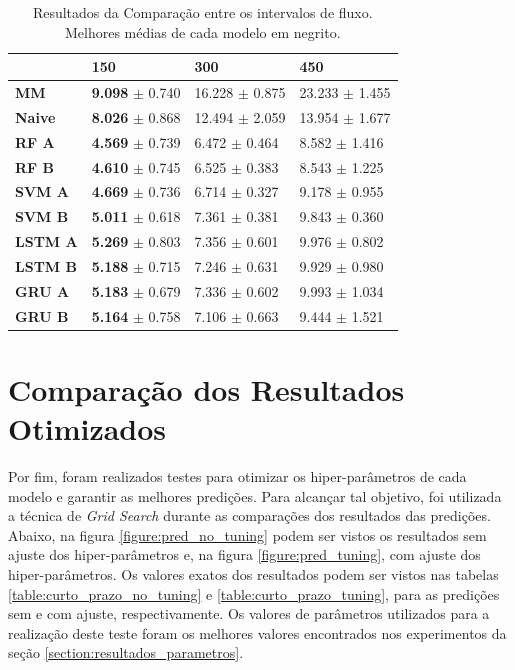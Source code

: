 \begin{table}[H]
    \begin{tabular*}{\linewidth}{@{\extracolsep{\fill}}llll}
    \toprule
     & 
    \multicolumn{1}{l}{\textbf{150}} & 
    \multicolumn{1}{l}{\textbf{300}} &
    \multicolumn{1}{l}{\textbf{450}} \\
    \midrule
    \textbf{MM} & \textbf{9.098} $\pm$ 0.740 & 16.228 $\pm$ 0.875 & 23.233 $\pm$ 1.455
    \\
    \midrule
    \textbf{Naive} & \textbf{8.026} $\pm$ 0.868 & 12.494 $\pm$ 2.059 & 13.954 $\pm$ 1.677
    \\
    \midrule
    \textbf{RF A} & \textbf{4.569} $\pm$ 0.739 & 6.472 $\pm$ 0.464 & 8.582 $\pm$ 1.416
    \\
    \midrule
    \textbf{RF B} & \textbf{4.610} $\pm$ 0.745 & 6.525 $\pm$ 0.383 & 8.543 $\pm$ 1.225
    \\
    \midrule
    \textbf{SVM A} & \textbf{4.669} $\pm$ 0.736 & 6.714 $\pm$ 0.327 & 9.178 $\pm$ 0.955
    \\
    \midrule
    \textbf{SVM B} & \textbf{5.011} $\pm$ 0.618 & 7.361 $\pm$ 0.381 & 9.843 $\pm$ 0.360
    \\
    \midrule
    \textbf{LSTM A} & \textbf{5.269} $\pm$ 0.803 & 7.356 $\pm$ 0.601 & 9.976 $\pm$ 0.802
    \\
    \midrule
    \textbf{LSTM B} & \textbf{5.188} $\pm$ 0.715 & 7.246 $\pm$ 0.631 & 9.929 $\pm$ 0.980
    \\
    \midrule
    \textbf{GRU A} & \textbf{5.183} $\pm$ 0.679 & 7.336 $\pm$ 0.602 & 9.993 $\pm$ 1.034
    \\
    \midrule
    \textbf{GRU B} & \textbf{5.164} $\pm$ 0.758 & 7.106 $\pm$ 0.663 & 9.444 $\pm$ 1.521
    \\
    \bottomrule
    \end{tabular*}
    \label{table:res_flow}
    \caption{Resultados da Comparação entre os intervalos de fluxo. Melhores médias de cada modelo em negrito.}
\end{table}

\section{Comparação dos Resultados Otimizados}

 Por fim, foram realizados testes para otimizar os hiper-parâmetros de cada modelo e garantir as melhores predições. Para alcançar tal objetivo, foi utilizada a técnica de \textit{Grid Search} durante as comparações dos resultados das predições. Abaixo, na figura \ref{figure:pred_no_tuning} podem ser vistos os resultados sem ajuste dos hiper-parâmetros e, na figura \ref{figure:pred_tuning}, com ajuste dos hiper-parâmetros. Os valores exatos dos resultados podem ser vistos nas tabelas  \ref{table:curto_prazo_no_tuning} e \ref{table:curto_prazo_tuning}, para as predições sem e com ajuste, respectivamente. Os valores de parâmetros utilizados para a realização deste teste foram os melhores valores encontrados nos experimentos da seção \ref{section:resultados_parametros}.
 
